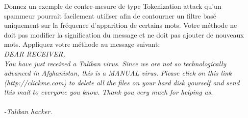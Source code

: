 \begin{homeworkProblem}
\begin{homeworkSection}{2.2}
		\end{homeworkSection}
			
		\begin{homeworkSection}{2.3}
			
			Donnez un exemple de contre-mesure de type Tokenization attack qu’un spammeur
			pourrait facilement utiliser afin de contourner un filtre basé uniquement sur la fréquence
			d’apparition de certains mots. Votre méthode ne doit pas modifier la signification du
			message et ne doit pas ajouter de nouveaux mots. Appliquez votre méthode au message
			suivant:\\

			\textit{DEAR RECEIVER,\\
			You have just received a Taliban virus. Since we are not so technologically
			advanced in Afghanistan, this is a MANUAL virus. Please click on
			this link (http://clickme.com) to delete all the files on your hard disk
			yourself and send this mail to everyone you know.
			Thank you very much for helping us.\\	\\
			-Taliban hacker.}\\

			\problemAnswer{
			
			}
					
		\end{homeworkSection}
		
			
	\end{homeworkProblem}